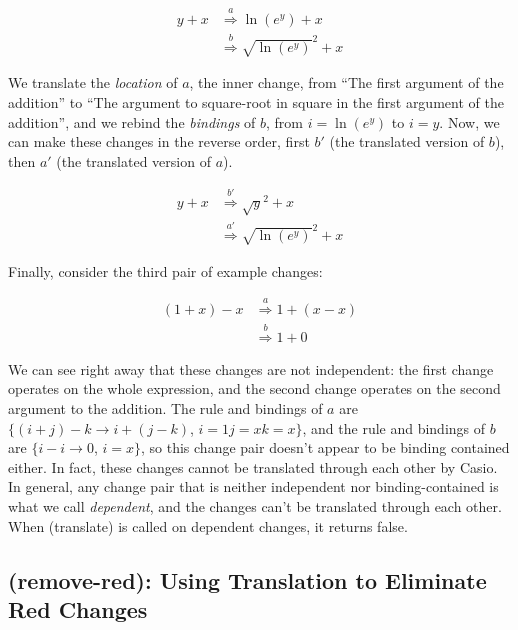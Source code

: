 \documentclass{article}
\newcommand{\insetarrow}[1]{\stackrel{#1}{\Rightarrow}}
\newcommand{\lnexp}[1]{\ln{\left(e^{#1}\right)}}
\newcommand{\sqrsqrt}[1]{\sqrt{#1}^2}
\begin{document}
\begin{align*}
y + x &\insetarrow{a} \lnexp{y} + x \\
&\insetarrow{b} \sqrsqrt{\lnexp{y}} + x
\end{align*}

We translate the \emph{location} of $a$,
the inner change,
from ``The first argument of the addition''
to ``The argument to square-root in square in the first argument of the addition'',
and we rebind the \emph{bindings} of $b$,
from $i=\lnexp{y}$
to $i=y$.
Now, we can make these changes in the reverse order,
first $b'$ (the translated version of $b$),
then $a'$ (the translated version of $a$).

\begin{align*}
y + x &\insetarrow{b'} \sqrsqrt{y} + x\\
&\insetarrow{a'} \sqrsqrt{\lnexp{y}} + x
\end{align*}

Finally, consider the third pair of example changes:

\begin{align*}
(1 + x) - x &\insetarrow{a} 1 + (x - x) \\
&\insetarrow{b} 1 + 0
\end{align*}

We can see right away that these changes are not independent:
the first change operates on the whole expression,
and the second change operates on the second argument to the addition.
The rule and bindings of $a$ are $\{(i + j) - k \to i + (j - k)$, $i=1 j=x k=x\}$,
and the rule and bindings of $b$ are $\{i-i\to0$, $i=x\}$,
so this change pair doesn't appear to be binding contained either.
In fact, these changes cannot be translated through each other by Casio.
In general, any change pair that is neither independent nor binding-contained
is what we call \emph{dependent},
and the changes can't be translated through each other.
When (translate) is called on dependent changes, it returns false.

\subsection{(remove-red): Using Translation to Eliminate Red Changes}
\end{document}
